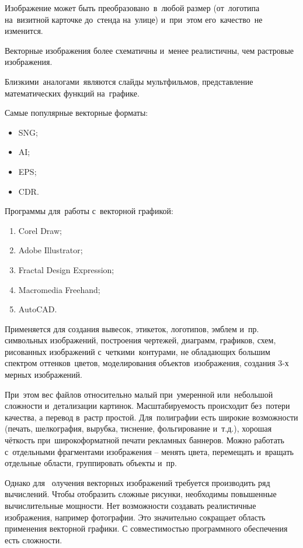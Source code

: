 \documentclass{ou}
\begin{document}
Изображение может быть преобразовано~в~любой размер (от~логотипа на~визитной карточке до~стенда на~улице) и~при~этом его~качество~не изменится.

Векторные изображения более схематичны и~менее реалистичны, чем растровые изображения.

Близкими~аналогами~являются слайды мультфильмов, представление математических функций на~графике.

Самые популярные векторные форматы:
\begin{itemize}[label=-, leftmargin=0em, itemindent=3.35em, nosep]
\item SNG;
\item AI;
\item EPS;
\item CDR.
\end{itemize}

Программы для~работы с~векторной графикой:
\begin{enumerate}[leftmargin=0em, itemindent=3.75em, nosep, label=\arabic*)]
\item Corel Draw;
\item Adobe Illustrator;
\item Fractal Design Expression;
\item Macromedia Freehand;
\item AutoCAD.
\end{enumerate}

Применяется для создания вывесок, этикеток, логотипов, эмблем и~пр. символьных изображений, построения чертежей, диаграмм, графиков, схем, рисованных изображений с~четкими~контурами, не обладающих большим спектром оттенков~цветов, моделирования объектов~изображения, создания 3-х мерных изображений.

При~этом вес файлов относительно малый при~умеренной или~небольшой сложности и~детализации картинок. Масштабируемость происходит без~потери качества, а перевод в~растр простой. Для~полиграфии есть широкие возможности (печать, шелкография, вырубка, тиснение, фольгирование и~т.д.), хорошая чёткость при~широкоформатной печати рекламных баннеров. Можно работать с~отдельными фрагментами изображения -- менять цвета, перемещать и~вращать отдельные области, группировать объекты и~пр.

Однако для~ олучения векторных изображений требуется производить ряд вычислений. Чтобы отобразить сложные рисунки, необходимы повышенные вычислительные мощности. Нет возможности создавать реалистичные изображения, например фотографии. Это значительно сокращает область применения векторной графики. С совместимостью программного обеспечения есть сложности.
\end{document}
